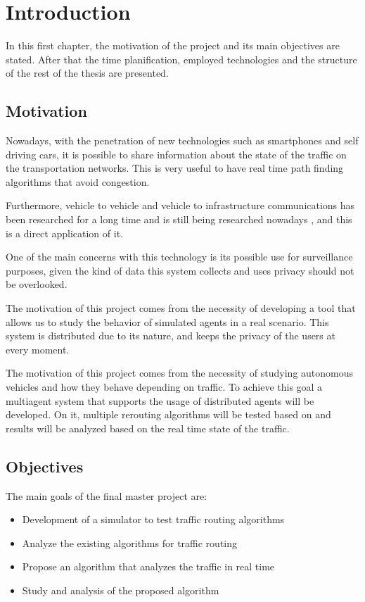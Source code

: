 \chapter{Introduction}

In this first chapter, the motivation of the project and its main objectives are stated. After that the time planification, employed technologies and the structure of the rest of the thesis are presented.

\section{Motivation}

Nowadays, with the penetration of new technologies such as smartphones and self driving cars, it is possible to share information about the state of the traffic on the transportation networks. This is very useful to have real time path finding algorithms that avoid congestion.

Furthermore, vehicle to vehicle and vehicle to infrastructure communications has been researched for a long time\cite{yang_liu_zhao_vaidya} and is still being researched nowadays \cite{tuohy_glavin_hughes_jones_trivedi_kilmartin_2015}, and this is a direct application of it.

One of the main concerns with this technology is its possible use for surveillance purposes, given the kind of data this system collects and uses privacy should not be overlooked.

The motivation of this project comes from the necessity of developing a tool that allows us to study the behavior of simulated agents in a real scenario. This system is distributed due to its nature, and keeps the privacy of the users at every moment.

The motivation of this project comes from the necessity of studying autonomous vehicles and how they behave depending on traffic. To achieve this goal a multiagent system that supports the usage of distributed agents will be developed. On it, multiple rerouting algorithms will be tested based on 
\cite{nisan_2007} and results will be analyzed based on the real time state of the traffic.

\section{Objectives}

The main goals of the final master project are:

\begin{itemize}
\item Development of a simulator to test traffic routing algorithms
\item Analyze the existing algorithms for traffic routing
\item Propose an algorithm that analyzes the traffic in real time
\item Study and analysis of the proposed algorithm
\end{itemize}

